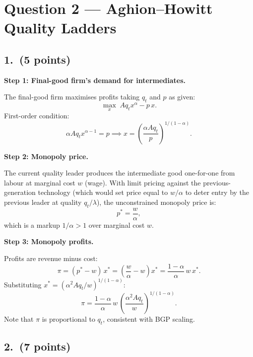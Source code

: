 \documentclass[a4paper,11pt]{article}
\begin{document}
\clearpage

\section{Question 2 --- Aghion--Howitt Quality Ladders}

\subsection*{1.\ (5 points)}

\begin{answerbox}
\textbf{Step 1: Final-good firm's demand for intermediates.}

The final-good firm maximises profits taking $q_t$ and $p$ as given:
\[
    \max_x \; A q_t x^{\alpha} - p\,x.
\]
First-order condition:
\[
    \alpha A q_t x^{\alpha-1} = p \implies x = \left(\frac{\alpha A q_t}{p}\right)^{1/(1-\alpha)}.
\]

\textbf{Step 2: Monopoly price.}

The current quality leader produces the intermediate good one-for-one from labour at
marginal cost $w$ (wage). With limit pricing against the previous-generation technology
(which would set price equal to $w/\alpha$ to deter entry by the previous leader at quality
$q_t/\lambda$), the unconstrained monopoly price is:
\[
    p^* = \frac{w}{\alpha},
\]
which is a markup $1/\alpha > 1$ over marginal cost $w$.

\textbf{Step 3: Monopoly profits.}

Profits are revenue minus cost:
\[
    \pi = (p^* - w)\,x^* = \left(\frac{w}{\alpha} - w\right)x^*
    = \frac{1-\alpha}{\alpha}\,w\,x^*.
\]
Substituting $x^* = (\alpha^2 A q_t/w)^{1/(1-\alpha)}$:
\[
    \boxed{\pi = \frac{1-\alpha}{\alpha}\,w\,\left(\frac{\alpha^2 A q_t}{w}\right)^{1/(1-\alpha)}.}
\]
Note that $\pi$ is proportional to $q_t$, consistent with BGP scaling.
\end{answerbox}

\subsection*{2.\ (7 points)}
\end{document}
